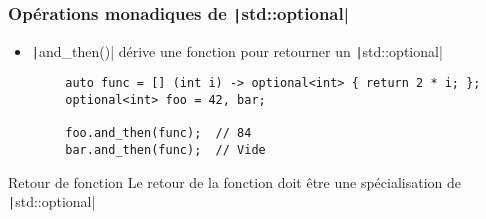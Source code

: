 \documentclass[C++.tex]{subfiles}
\begin{document}
\begin{frame}[fragile]
	\frametitle{Opérations monadiques de \texttt|std::optional|}
	\begin{itemize}
		\item \texttt|and_then()| dérive une fonction pour retourner un \texttt|std::optional|
	\end{itemize}

	\begin{verbatim}
		auto func = [] (int i) -> optional<int> { return 2 * i; };
		optional<int> foo = 42, bar;

		foo.and_then(func);  // 84
		bar.and_then(func);  // Vide
	\end{verbatim}

	\begin{alertblock}{Retour de fonction}
		Le retour de la fonction doit être une spécialisation de \texttt|std::optional|
	\end{alertblock}


\end{frame}
\end{document}
